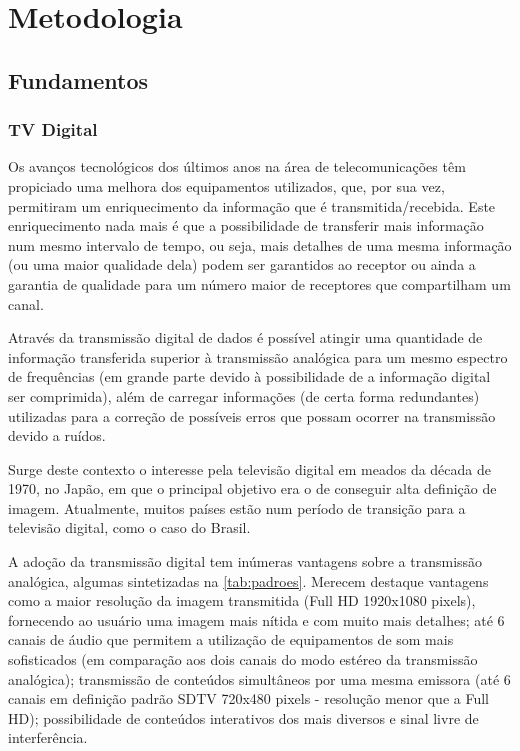 \chapter{Metodologia}

\section{Fundamentos}

\subsection{TV Digital}

Os avanços tecnológicos dos últimos anos na área de telecomunicações têm propiciado uma melhora dos equipamentos utilizados, que, por sua vez, permitiram um enriquecimento da informação que é transmitida/recebida. Este enriquecimento nada mais é que a possibilidade de transferir mais informação num mesmo intervalo de tempo, ou seja, mais detalhes de uma mesma informação (ou uma maior qualidade dela) podem ser garantidos ao receptor ou ainda a garantia de qualidade para um número maior de receptores que compartilham um canal.

Através da transmissão digital de dados é possível atingir uma quantidade de informação transferida superior à transmissão analógica para um mesmo espectro de frequências (em grande parte devido à possibilidade de a informação digital ser comprimida), além de carregar informações (de certa forma redundantes) utilizadas para a correção de possíveis erros que possam ocorrer na transmissão devido a ruídos.

Surge deste contexto o interesse pela televisão digital em meados da década de 1970, no Japão, em que o principal objetivo era o de conseguir alta definição de imagem. Atualmente, muitos países estão num período de transição para a televisão digital, como o caso do Brasil.

A adoção da transmissão digital tem inúmeras vantagens sobre a transmissão analógica, algumas sintetizadas na \ref{tab:padroes}. Merecem destaque vantagens como a maior resolução da imagem transmitida (Full HD 1920x1080 pixels), fornecendo ao usuário uma imagem mais nítida e com muito mais detalhes; até 6 canais de áudio que permitem a utilização de equipamentos de som mais sofisticados (em comparação aos dois canais do modo estéreo da transmissão analógica); transmissão de conteúdos simultâneos por uma mesma emissora (até 6 canais em definição padrão SDTV 720x480 pixels - resolução menor que a Full HD); possibilidade de conteúdos interativos dos mais diversos e sinal livre de interferência.

